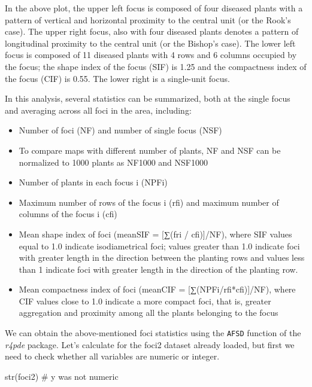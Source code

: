 \documentclass[
  letterpaper,
  DIV=11,
  numbers=noendperiod]{scrreprt}
\newenvironment{Shaded}{\begin{snugshade}}{\end{snugshade}}
\newcommand{\CommentTok}[1]{\textcolor[rgb]{0.37,0.37,0.37}{#1}}
\newcommand{\FunctionTok}[1]{\textcolor[rgb]{0.28,0.35,0.67}{#1}}
\newcommand{\NormalTok}[1]{\textcolor[rgb]{0.00,0.23,0.31}{#1}}
\begin{document}
In the above plot, the upper left focus is composed of four diseased
plants with a pattern of vertical and horizontal proximity to the
central unit (or the Rook's case). The upper right focus, also with four
diseased plants denotes a pattern of longitudinal proximity to the
central unit (or the Bishop's case). The lower left focus is composed of
11 diseased plants with 4 rows and 6 columns occupied by the focus; the
shape index of the focus (SIF) is 1.25 and the compactness index of the
focus (CIF) is 0.55. The lower right is a single-unit focus.

In this analysis, several statistics can be summarized, both at the
single focus and averaging across all foci in the area, including:

\begin{itemize}
\item
  Number of foci (NF) and number of single focus (NSF)
\item
  To compare maps with different number of plants, NF and NSF can be
  normalized to 1000 plants as NF1000 and NSF1000
\item
  Number of plants in each focus i (NPFi)
\item
  Maximum number of rows of the focus i (rfi) and maximum number of
  columns of the focus i (cfi)
\item
  Mean shape index of foci (meanSIF = {[}∑(fri / cfi){]}/NF), where SIF
  values equal to 1.0 indicate isodiametrical foci; values greater than
  1.0 indicate foci with greater length in the direction between the
  planting rows and values less than 1 indicate foci with greater length
  in the direction of the planting row.
\item
  Mean compactness index of foci (meanCIF = {[}∑(NPFi/rfi*cfi){]}/NF),
  where CIF values close to 1.0 indicate a more compact foci, that is,
  greater aggregation and proximity among all the plants belonging to
  the focus
\end{itemize}

We can obtain the above-mentioned foci statistics using the
\texttt{AFSD} function of the \emph{r4pde} package. Let's calculate for
the foci2 dataset already loaded, but first we need to check whether all
variables are numeric or integer.

\begin{Shaded}
\begin{Highlighting}[]
\FunctionTok{str}\NormalTok{(foci2) }\CommentTok{\# y was not numeric}
\end{Highlighting}
\end{Shaded}
\end{document}
